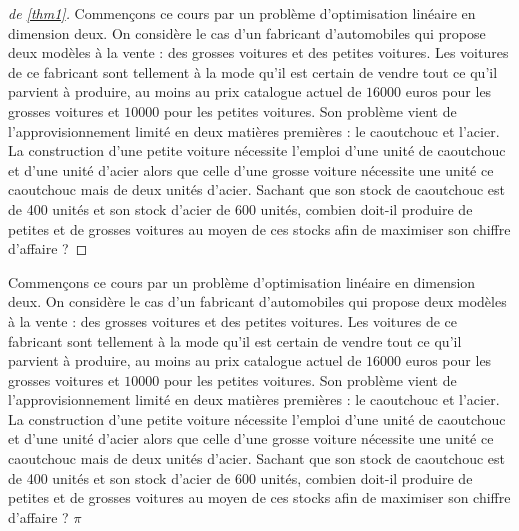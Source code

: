\documentclass[a4paper, 11pt,openany]{book}%
\newtheorem[L]{thm}{Théorème}[section]
\newtheorem[M]{propo}[thm]{Proposition}
\newtheorem[M]{prop}[thm]{Propriété}
\newtheorem[M]{coro}[thm]{Corollaire}
\newtheorem[M]{lem}[thm]{Lemme}
\newtheorem[M,bodystyle=]{defi}[thm]{Définition}
\newtheorem[M,bodystyle=]{remark}[thm]{Remarque}
\newtheorem[M,bodystyle=]{met}[thm]{Méthode}
\newtheorem[M,bodystyle=]{ret}[thm]{A retenir}
\newtheorem[M,bodystyle=]{idee}[thm]{Idée}
\newtheorem[style=S,underline=false,bodystyle=]{exem}[thm]{Exemple}
\newtheorem[S,underline=false,bodystyle=]{exo}[thm]{Exercice}
\newtheorem[S,underline=false,bodystyle=]{appli}[thm]{Application}
\newtheorem[S,underline=false,bodystyle=]{sol}[thm]{Solution}
\newtheorem[S,underline=false,bodystyle=]{hypo}[thm]{Hypothesis}
\newtheorem[S,underline=false,bodystyle=]{nota}[thm]{Notation}
\begin{document}
\begin{proof}[de \ref{thm1}]

         Commençons ce cours par un problème d'optimisation linéaire en dimension deux. On considère le cas d'un fabricant d'automobiles qui propose deux modèles à la vente : des grosses voitures et des petites voitures. Les voitures de ce fabricant sont tellement à la mode qu'il est certain de vendre tout ce qu'il parvient à produire, au moins au prix catalogue actuel de $16000$ euros pour les grosses voitures et $10000$ pour les petites voitures. Son problème vient de l'approvisionnement limité en deux matières premières : le caoutchouc et l'acier. La construction d'une petite voiture nécessite l'emploi d'une unité de caoutchouc et d'une unité d'acier alors que celle d'une grosse voiture nécessite une unité ce caoutchouc mais de deux unités d'acier. Sachant que son stock de caoutchouc est de 400 unités et son stock d'acier de 600 unités, combien doit-il produire de petites et de grosses voitures au moyen de ces stocks afin de maximiser son chiffre d'affaire ?

         \end{proof}



               Commençons ce cours par un problème d'optimisation linéaire en dimension deux. On considère le cas d'un fabricant d'automobiles qui propose deux modèles à la vente : des grosses voitures et des petites voitures. Les voitures de ce fabricant sont tellement à la mode qu'il est certain de vendre tout ce qu'il parvient à produire, au moins au prix catalogue actuel de $16000$ euros pour les grosses voitures et $10000$ pour les petites voitures. Son problème vient de l'approvisionnement limité en deux matières premières : le caoutchouc et l'acier. La construction d'une petite voiture nécessite l'emploi d'une unité de caoutchouc et d'une unité d'acier alors que celle d'une grosse voiture nécessite une unité ce caoutchouc mais de deux unités d'acier. Sachant que son stock de caoutchouc est de 400 unités et son stock d'acier de 600 unités, combien doit-il produire de petites et de grosses voitures au moyen de ces stocks afin de maximiser son chiffre d'affaire ? $\pi$

               
\end{document}
